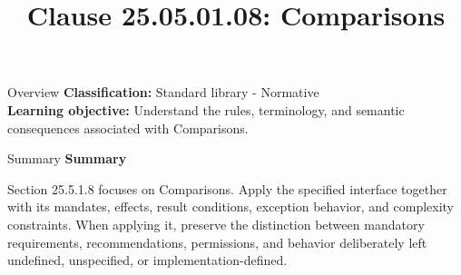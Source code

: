 \documentclass[10pt,letterpaper]{article}
\title{Clause 25.05.01.08: Comparisons}
\author{}
\date{}
\begin{document}
\maketitle
\begin{CornellOverviewBox}{Overview}
\textbf{Classification:} Standard library - Normative\\[2pt]
\textbf{Learning objective:} Understand the rules, terminology, and semantic consequences associated with Comparisons.
\end{CornellOverviewBox}\begin{CornellSummaryBox}{Summary}
{\sffamily\bfseries\color{Accent} Summary}\par\vspace{3pt}Section 25.5.1.8 focuses on Comparisons. Apply the specified interface together with its mandates, effects, result conditions, exception behavior, and complexity constraints. When applying it, preserve the distinction between mandatory requirements, recommendations, permissions, and behavior deliberately left undefined, unspecified, or implementation-defined.
\end{CornellSummaryBox}
\end{document}
